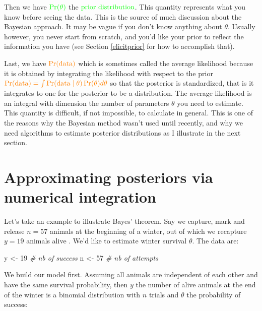 \documentclass[
  12pt,
]{krantz}
\newenvironment{Shaded}{\begin{snugshade}}{\end{snugshade}}
\newcommand{\CommentTok}[1]{\textcolor[rgb]{0.56,0.35,0.01}{\textit{#1}}}
\newcommand{\DecValTok}[1]{\textcolor[rgb]{0.00,0.00,0.81}{#1}}
\newcommand{\NormalTok}[1]{#1}
\newcommand{\OtherTok}[1]{\textcolor[rgb]{0.56,0.35,0.01}{#1}}
\begin{document}
Then we have \(\color{green}{\Pr(\theta)}\) the \(\color{green}{\text{prior distribution}}\). This quantity represents what you know before seeing the data. This is the source of much discussion about the Bayesian approach. It may be vague if you don't know anything about \(\theta\). Usually however, you never start from scratch, and you'd like your prior to reflect the information you have (see Section \ref{elicitprior} for how to accomplish that).

Last, we have \(\color{orange}{\Pr(\text{data})}\) which is sometimes called the average likelihood because it is obtained by integrating the likelihood with respect to the prior \(\color{orange}{\Pr(\text{data}) = \int{\Pr(\text{data} \mid \theta)\Pr(\theta) d\theta}}\) so that the posterior is standardized, that is it integrates to one for the posterior to be a distribution. The average likelihood is an integral with dimension the number of parameters \(\theta\) you need to estimate. This quantity is difficult, if not impossible, to calculate in general. This is one of the reasons why the Bayesian method wasn't used until recently, and why we need algorithms to estimate posterior distributions as I illustrate in the next section.

\section{Approximating posteriors via numerical integration}\label{numerical-approx}

Let's take an example to illustrate Bayes' theorem. Say we capture, mark and release \(n = 57\) animals at the beginning of a winter, out of which we recapture \(y = 19\) animals alive \citep[we used a similar example in][]{king_bayesian_2009}. We'd like to estimate winter survival \(\theta\). The data are:

\begin{Shaded}
\begin{Highlighting}[]
\NormalTok{y }\OtherTok{\textless{}{-}} \DecValTok{19} \CommentTok{\# nb of success}
\NormalTok{n }\OtherTok{\textless{}{-}} \DecValTok{57} \CommentTok{\# nb of attempts}
\end{Highlighting}
\end{Shaded}

We build our model first. Assuming all animals are independent of each other and have the same survival probability, then \(y\) the number of alive animals at the end of the winter is a binomial distribution with \(n\) trials and \(\theta\) the probability of success:
\end{document}
